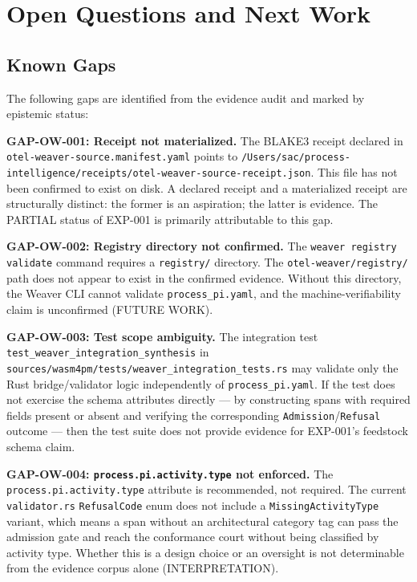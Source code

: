 
\section{Open Questions and Next Work}
\label{sec:otel-weaver-exp-001-custom-pi-registry-questions}

\subsection{Known Gaps}
\label{sec:otel-weaver-exp-001-custom-pi-registry-questions-gaps}

The following gaps are identified from the evidence audit and marked by epistemic status:

\textbf{GAP-OW-001: Receipt not materialized.}
The BLAKE3 receipt declared in \texttt{otel-weaver-source.manifest.yaml} points to
\texttt{/Users/sac/process-intelligence/receipts/otel-weaver-source-receipt.json}. This file
has not been confirmed to exist on disk. A declared receipt and a materialized receipt are
structurally distinct: the former is an aspiration; the latter is evidence. The PARTIAL status
of EXP-001 is primarily attributable to this gap.

\textbf{GAP-OW-002: Registry directory not confirmed.}
The \texttt{weaver registry validate} command requires a \texttt{registry/} directory. The
\texttt{otel-weaver/registry/} path does not appear to exist in the confirmed evidence.
Without this directory, the Weaver CLI cannot validate \texttt{process\_pi.yaml}, and the
machine-verifiability claim is unconfirmed (FUTURE WORK).

\textbf{GAP-OW-003: Test scope ambiguity.}
The integration test \texttt{test\_weaver\_integration\_synthesis} in
\texttt{sources/wasm4pm/tests/weaver\_integration\_tests.rs} may validate only the Rust
bridge/validator logic independently of \texttt{process\_pi.yaml}. If the test does not
exercise the schema attributes directly --- by constructing spans with required fields
present or absent and verifying the corresponding \texttt{Admission}/\texttt{Refusal} outcome
--- then the test suite does not provide evidence for EXP-001's feedstock schema claim.

\textbf{GAP-OW-004: \texttt{process.pi.activity.type} not enforced.}
The \texttt{process.pi.activity.type} attribute is recommended, not required. The current
\texttt{validator.rs} \texttt{RefusalCode} enum does not include a
\texttt{MissingActivityType} variant, which means a span without an architectural category
tag can pass the admission gate and reach the conformance court without being classified
by activity type. Whether this is a design choice or an oversight is not determinable from
the evidence corpus alone (INTERPRETATION).

